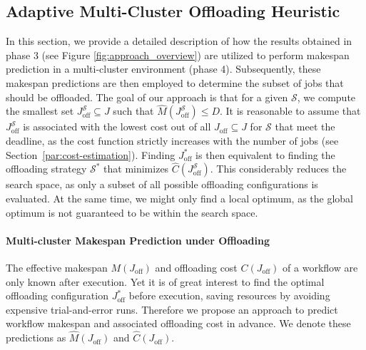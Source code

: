 \subsection{Adaptive Multi-Cluster Offloading Heuristic}
\label{subsec:heuristic}
In this section, we provide a detailed description of how the results obtained in phase 3 (see Figure \ref{fig:approach_overview}) are utilized to perform makespan prediction in a multi-cluster environment (phase 4). Subsequently, these makespan predictions are then employed to determine the subset of jobs that should be offloaded.
The goal of our approach is that for a given $\mathcal{S}$, we compute the smallest set $J^{\mathcal{S}}_\text{off} \subseteq J$ such that $\hat{M}(J^{\mathcal{S}}_\text{off}) \leq D$. 
It is reasonable to assume that $J^{\mathcal{S}}_\text{off}$ is associated with the lowest cost out of all $J_{\text{off}} \subseteq J$ for $\mathcal{S}$ that meet the deadline, as the cost function strictly increases with the number of jobs (see Section~\ref{par:cost-estimation}). Finding $J_{\text{off}}^*$ is then equivalent to finding the offloading strategy $\mathcal{S}^*$ that minimizes $\hat{C}(J^{\mathcal{S}}_\text{off})$. This considerably reduces the search space, as only a subset of all possible offloading configurations is evaluated. At the same time, we might only find a local optimum, as the global optimum is not guaranteed to be within the search space.


\paragraph{Multi-cluster Makespan Prediction under Offloading}\label{par:makespan_prediction}

The effective makespan $M(J_{\text{off}})$ and offloading cost $C(J_{\text{off}})$ of a workflow are only known after execution. Yet it is of great interest to find the optimal offloading configuration $J_{\text{off}}^*$ before execution, saving resources by avoiding expensive trial-and-error runs. 
Therefore we propose an approach to predict workflow makespan and associated offloading cost in advance.
We denote these predictions as $\hat{M}(J_{\text{off}})$ and $\hat{C}(J_{\text{off}})$. 

